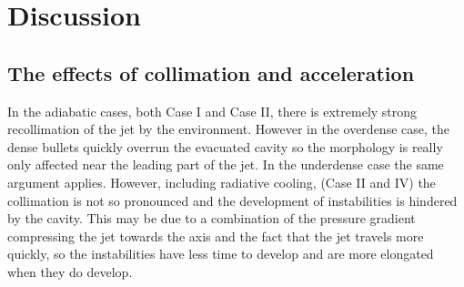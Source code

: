 



\section{Discussion} 

\subsection{The effects of collimation and acceleration}

In the adiabatic cases, both Case I and Case II, there is extremely strong recollimation of the jet by the environment.
However in the overdense case, the dense bullets quickly overrun the evacuated cavity so the morphology is really only affected near the leading part of the jet.
In the underdense case the same argument applies.
However, including radiative cooling, (Case II and IV) the collimation is not so pronounced and the development of instabilities is hindered by the cavity.
This may be due to a combination of the pressure gradient compressing the jet towards the axis and the fact that the jet travels more quickly, so the instabilities have less time to develop and are more elongated when they do develop.

